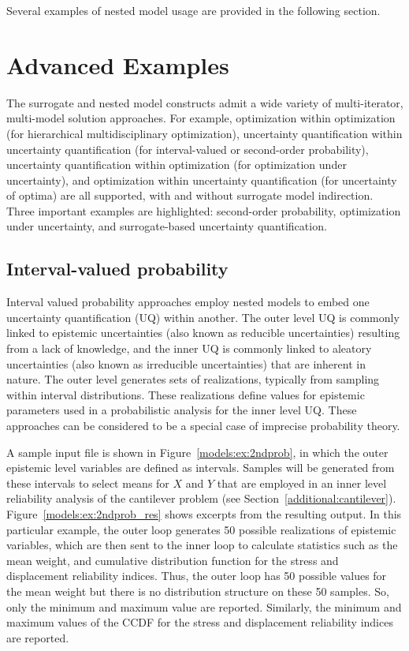 Several examples of nested model usage are provided in the following
section.


\section{Advanced Examples} \label{models:ex}


The surrogate and nested model constructs admit a wide variety of
multi-iterator, multi-model solution approaches.  For example,
optimization within optimization (for hierarchical multidisciplinary
optimization), uncertainty quantification within uncertainty
quantification (for interval-valued or second-order probability), uncertainty
quantification within optimization (for optimization under
uncertainty), and optimization within uncertainty quantification (for
uncertainty of optima) are all supported, with and without surrogate
model indirection.  Three important examples are highlighted:
second-order probability, optimization under uncertainty, and surrogate-based
uncertainty quantification.


\subsection{Interval-valued probability} \label{models:ex:sop}

Interval valued probability approaches employ nested models to embed one
uncertainty quantification (UQ) within another.  The outer level UQ is
commonly linked to epistemic uncertainties (also known as reducible
uncertainties) resulting from a lack of knowledge, and the inner UQ is
commonly linked to aleatory uncertainties (also known as irreducible
uncertainties) that are inherent in nature. The outer level generates
sets of realizations, typically from sampling within interval
distributions.  These realizations define values for epistemic 
parameters used in a probabilistic analysis for the inner level UQ.
These approaches can be considered to be a special case of imprecise
probability theory.

A sample input file is shown in Figure~\ref{models:ex:2ndprob}, in
which the outer epistemic level variables are defined as intervals. 
Samples will be generated from these intervals to select means for
$X$ and $Y$ that are employed in an inner level reliability analysis
of the cantilever problem (see Section~\ref{additional:cantilever}).
Figure~\ref{models:ex:2ndprob_res} shows excerpts from the resulting
output.  In this particular example, the outer loop generates 50 
possible realizations of epistemic variables, which are then 
sent to the inner loop to calculate statistics such as 
the mean weight, 
and cumulative distribution function for the stress and displacement
reliability indices.  Thus, the outer loop has 50 possible values for the mean 
weight but there is no distribution structure on these 50 samples.  So, 
only the minimum and maximum value are reported.  Similarly, the 
minimum and maximum values of the CCDF for the stress and 
displacement reliability indices are reported. 

